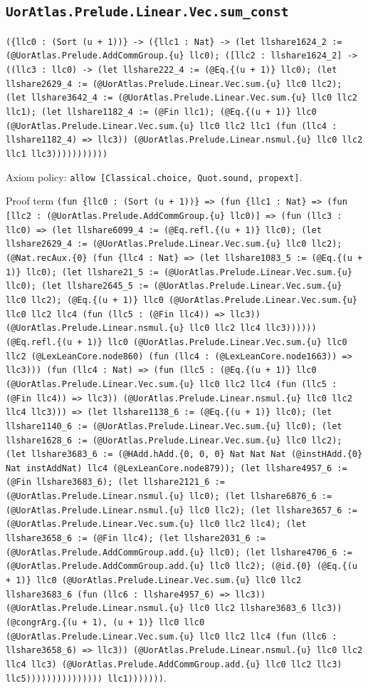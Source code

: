 \documentclass[11pt]{article}
\begin{document}
\subsection*{\texttt{UorAtlas.Prelude.Linear.Vec.sum\_const}}
\noindent\texttt{(\{llc0 : (Sort (u + 1))\} -> (\{llc1 : Nat\} -> (let llshare1624\_2 := (@UorAtlas.Prelude.AddCommGroup.\{u\} llc0); ([llc2 : llshare1624\_2] -> ((llc3 : llc0) -> (let llshare222\_4 := (@Eq.\{(u + 1)\} llc0); (let llshare2629\_4 := (@UorAtlas.Prelude.Linear.Vec.sum.\{u\} llc0 llc2); (let llshare3642\_4 := (@UorAtlas.Prelude.Linear.Vec.sum.\{u\} llc0 llc2 llc1); (let llshare1182\_4 := (@Fin llc1); (@Eq.\{(u + 1)\} llc0 (@UorAtlas.Prelude.Linear.Vec.sum.\{u\} llc0 llc2 llc1 (fun (llc4 : llshare1182\_4) => llc3)) (@UorAtlas.Prelude.Linear.nsmul.\{u\} llc0 llc2 llc1 llc3)))))))))))}\par
\noindent Axiom policy: \texttt{allow [Classical.choice, Quot.sound, propext]}.\par
\noindent Proof term \texttt{(fun \{llc0 : (Sort (u + 1))\} => (fun \{llc1 : Nat\} => (fun [llc2 : (@UorAtlas.Prelude.AddCommGroup.\{u\} llc0)] => (fun (llc3 : llc0) => (let llshare6099\_4 := (@Eq.refl.\{(u + 1)\} llc0); (let llshare2629\_4 := (@UorAtlas.Prelude.Linear.Vec.sum.\{u\} llc0 llc2); (@Nat.recAux.\{0\} (fun \{llc4 : Nat\} => (let llshare1083\_5 := (@Eq.\{(u + 1)\} llc0); (let llshare21\_5 := (@UorAtlas.Prelude.Linear.Vec.sum.\{u\} llc0); (let llshare2645\_5 := (@UorAtlas.Prelude.Linear.Vec.sum.\{u\} llc0 llc2); (@Eq.\{(u + 1)\} llc0 (@UorAtlas.Prelude.Linear.Vec.sum.\{u\} llc0 llc2 llc4 (fun (llc5 : (@Fin llc4)) => llc3)) (@UorAtlas.Prelude.Linear.nsmul.\{u\} llc0 llc2 llc4 llc3)))))) (@Eq.refl.\{(u + 1)\} llc0 (@UorAtlas.Prelude.Linear.Vec.sum.\{u\} llc0 llc2 (@LexLeanCore.node860) (fun (llc4 : (@LexLeanCore.node1663)) => llc3))) (fun (llc4 : Nat) => (fun (llc5 : (@Eq.\{(u + 1)\} llc0 (@UorAtlas.Prelude.Linear.Vec.sum.\{u\} llc0 llc2 llc4 (fun (llc5 : (@Fin llc4)) => llc3)) (@UorAtlas.Prelude.Linear.nsmul.\{u\} llc0 llc2 llc4 llc3))) => (let llshare1138\_6 := (@Eq.\{(u + 1)\} llc0); (let llshare1140\_6 := (@UorAtlas.Prelude.Linear.Vec.sum.\{u\} llc0); (let llshare1628\_6 := (@UorAtlas.Prelude.Linear.Vec.sum.\{u\} llc0 llc2); (let llshare3683\_6 := (@HAdd.hAdd.\{0, 0, 0\} Nat Nat Nat (@instHAdd.\{0\} Nat instAddNat) llc4 (@LexLeanCore.node879)); (let llshare4957\_6 := (@Fin llshare3683\_6); (let llshare2121\_6 := (@UorAtlas.Prelude.Linear.nsmul.\{u\} llc0); (let llshare6876\_6 := (@UorAtlas.Prelude.Linear.nsmul.\{u\} llc0 llc2); (let llshare3657\_6 := (@UorAtlas.Prelude.Linear.Vec.sum.\{u\} llc0 llc2 llc4); (let llshare3658\_6 := (@Fin llc4); (let llshare2031\_6 := (@UorAtlas.Prelude.AddCommGroup.add.\{u\} llc0); (let llshare4706\_6 := (@UorAtlas.Prelude.AddCommGroup.add.\{u\} llc0 llc2); (@id.\{0\} (@Eq.\{(u + 1)\} llc0 (@UorAtlas.Prelude.Linear.Vec.sum.\{u\} llc0 llc2 llshare3683\_6 (fun (llc6 : llshare4957\_6) => llc3)) (@UorAtlas.Prelude.Linear.nsmul.\{u\} llc0 llc2 llshare3683\_6 llc3)) (@congrArg.\{(u + 1), (u + 1)\} llc0 llc0 (@UorAtlas.Prelude.Linear.Vec.sum.\{u\} llc0 llc2 llc4 (fun (llc6 : llshare3658\_6) => llc3)) (@UorAtlas.Prelude.Linear.nsmul.\{u\} llc0 llc2 llc4 llc3) (@UorAtlas.Prelude.AddCommGroup.add.\{u\} llc0 llc2 llc3) llc5))))))))))))))) llc1)))))))}.\par
\end{document}
